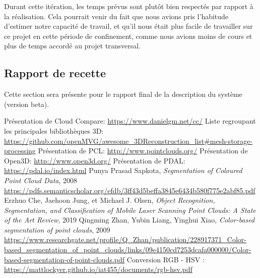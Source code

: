 \documentclass[12pt,titlepage,french]{article}
\begin{document}
Durant cette itération, les temps prévus sont plutôt bien respectés par rapport à la réalisation. Cela pourrait venir du fait que nous avions pris l'habitude d'estimer notre capacité de travail, et qu'il nous était plus facile de travailler sur ce projet en cette période de confinement, comme nous avions moins de cours et plus de temps accordé au projet transversal.

\subsection{Rapport de recette}

Cette section sera présente pour le rapport final de la description du système (version beta).
\begin{thebibliography}{3}
	 Présentation de Cloud Compare: \url{https://www.danielgm.net/cc/}
	 Liste regroupant les principales bibliothèques 3D: \url{https://github.com/openMVG/awesome_3DReconstruction_list#mesh-storage-processing}
	 Présentation de PCL: \url{http://www.pointclouds.org/}
	 Présentation de Open3D: \url{http://www.open3d.org/}
	 Présentation de PDAL: \url{https://pdal.io/index.html}
	 Punya Prasad Sapkota, \textit{Segmentation of Coloured Point Cloud Data}, 2008 \url{https://pdfs.semanticscholar.org/efdb/3ff43d5beffa3845e6434b580f775e2abf85.pdf}
	 Erzhuo Che, Jaehoon Jung, et Michael J. Olsen, \textit{Object Recognition, Segmentation, and Classification of Mobile Laser Scanning Point Clouds: A State of the Art Review}, 2019
	 Qingming Zhan, Yubin Liang, Yinghui Xiao, \textit{Color-based segmentation of point clouds}, 2009 \url{https://www.researchgate.net/profile/Q_Zhan/publication/228917371_Color-based_segmentation_of_point_clouds/links/09e4150cd7253dcafa000000/Color-based-segmentation-of-point-clouds.pdf}
  	 Conversion RGB - HSV : \url{https://mattlockyer.github.io/iat455/documents/rgb-hsv.pdf}
\end{thebibliography}
\end{document}
